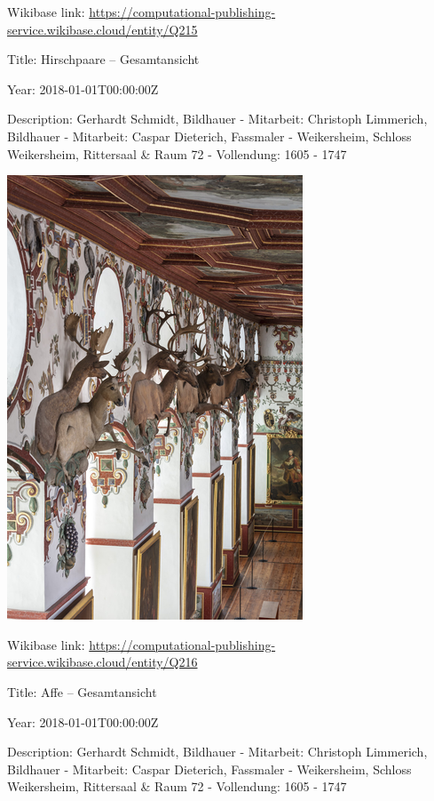 \documentclass[
  letterpaper,
]{book}
\begin{document}
Wikibase link:
\url{https://computational-publishing-service.wikibase.cloud/entity/Q215}

Title: Hirschpaare -- Gesamtansicht

Year: 2018-01-01T00:00:00Z

Description: Gerhardt Schmidt, Bildhauer - Mitarbeit: Christoph
Limmerich, Bildhauer - Mitarbeit: Caspar Dieterich, Fassmaler -
Weikersheim, Schloss Weikersheim, Rittersaal \& Raum 72 - Vollendung:
1605 - 1747

\includegraphics{paintings_files/figure-pdf/cell-3-output-66.png}

Wikibase link:
\url{https://computational-publishing-service.wikibase.cloud/entity/Q216}

Title: Affe -- Gesamtansicht

Year: 2018-01-01T00:00:00Z

Description: Gerhardt Schmidt, Bildhauer - Mitarbeit: Christoph
Limmerich, Bildhauer - Mitarbeit: Caspar Dieterich, Fassmaler -
Weikersheim, Schloss Weikersheim, Rittersaal \& Raum 72 - Vollendung:
1605 - 1747
\end{document}

